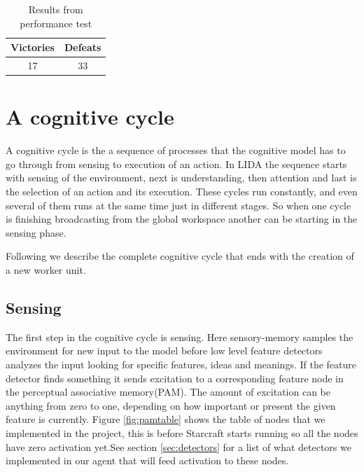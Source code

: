 \begin{table}
\begin{center}
\begin{tabular}{| c | c |}
  \hline                        
  Victories & Defeats\\
  \hline
  17 & 33 \\
  \hline  
\end{tabular}
\caption{Results from performance test}
\label{tab:test_results}
\end{center}
\end{table}

\section{A cognitive cycle}
A cognitive cycle is the a sequence of processes that the cognitive model has to go through from sensing to execution of an action. In LIDA the sequence starts with sensing of the environment, next is understanding, then attention and last is the selection of an action and its execution. These cycles run constantly, and even several of them runs at the same time just in different stages. So when one cycle is finishing broadcasting from the global workspace another can be starting in the sensing phase. 

Following we describe the complete cognitive cycle that ends with the creation of a new worker unit. 	

\subsection{Sensing}
The first step in the cognitive cycle is sensing. Here sensory-memory samples the environment for new input to the model before low level feature detectors analyzes the input looking for specific features, ideas and meanings. If the feature detector finds something it sends excitation to a corresponding feature node in the perceptual associative memory(PAM). The amount of excitation can be anything from zero to one, depending on how important or present the given feature is currently. Figure \ref{fig:pamtable} shows the table of nodes that we implemented in the project, this is before Starcraft starts running so all the nodes have zero activation yet.See section \ref{sec:detectors} for a list of what detectors we implemented in our agent that will feed activation to these nodes. 


